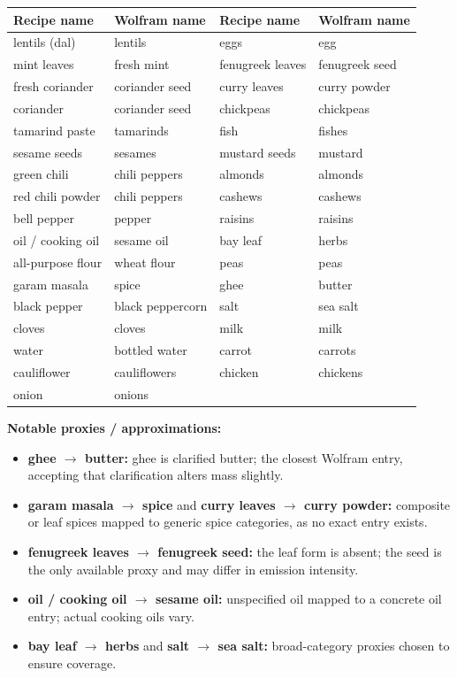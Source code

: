 \documentclass{article}
\begin{document}
\begin{center}
\begin{tabular}{ll|ll}
\hline
\textbf{Recipe name} & \textbf{Wolfram name} & \textbf{Recipe name} & \textbf{Wolfram name} \\
\hline
lentils (dal) & lentils & eggs & egg \\
mint leaves & fresh mint & fenugreek leaves & fenugreek seed \\
fresh coriander & coriander seed & curry leaves & curry powder \\
coriander & coriander seed & chickpeas & chickpeas \\
tamarind paste & tamarinds & fish & fishes \\
sesame seeds & sesames & mustard seeds & mustard \\
green chili & chili peppers & almonds & almonds \\
red chili powder & chili peppers & cashews & cashews \\
bell pepper & pepper & raisins & raisins \\
oil / cooking oil & sesame oil & bay leaf & herbs \\
all-purpose flour & wheat flour & peas & peas \\
garam masala & spice & ghee & butter \\
black pepper & black peppercorn & salt & sea salt \\
cloves & cloves & milk & milk \\
water & bottled water & carrot & carrots \\
cauliflower & cauliflowers & chicken & chickens \\
onion & onions & & \\
\hline
\end{tabular}
\end{center}

\noindent\textbf{Notable proxies / approximations:}
\begin{itemize}
    \item \textbf{ghee $\rightarrow$ butter:} ghee is clarified butter; the closest Wolfram entry, accepting that clarification alters mass slightly.
    \item \textbf{garam masala $\rightarrow$ spice} and \textbf{curry leaves $\rightarrow$ curry powder:} composite or leaf spices mapped to generic spice categories, as no exact entry exists.
    \item \textbf{fenugreek leaves $\rightarrow$ fenugreek seed:} the leaf form is absent; the seed is the only available proxy and may differ in emission intensity.
    \item \textbf{oil / cooking oil $\rightarrow$ sesame oil:} unspecified oil mapped to a concrete oil entry; actual cooking oils vary.
    \item \textbf{bay leaf $\rightarrow$ herbs} and \textbf{salt $\rightarrow$ sea salt:} broad-category proxies chosen to ensure coverage.
\end{itemize}
\end{document}
